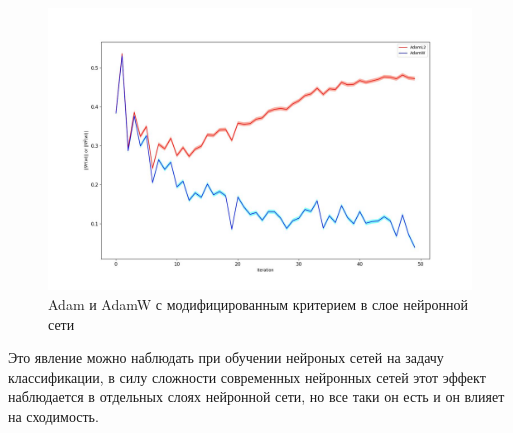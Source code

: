 \begin{figure}[h!]
\centering
\includegraphics[width=0.7\linewidth]{pictures/net_ADAMW.jpg}
\captionsetup{justification=centering,margin=0.5cm}
\caption{Adam и AdamW с модифицированным критерием в слое нейронной сети}
\label{fig:adam_net_special_errors}
\end{figure}

Это явление можно наблюдать при обучении нейроных сетей на задачу классификации, в силу сложности современных нейронных сетей этот эффект наблюдается в отдельных слоях нейронной сети, но все таки он есть и он влияет на сходимость.